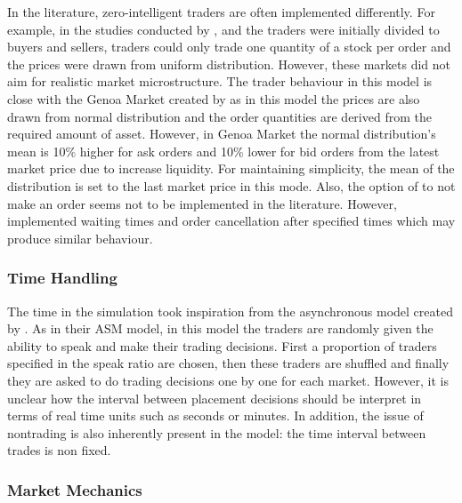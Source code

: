 In the literature, zero-intelligent traders are often implemented differently. For example, in the studies conducted by 
\citet{God93}, \citet{Jam96} and \citet{Mil08} the traders were initially divided to buyers and
sellers, traders could only trade one quantity of a stock per order and the prices
were drawn from uniform distribution. However, these markets did not aim for
realistic market microstructure. The trader behaviour in this model is close with the Genoa Market
created by \citet{Genoa01} as in this model the prices are also drawn from normal distribution and
the order quantities are derived from the required amount of asset. However, in Genoa Market the
normal distribution's mean is 10\% higher for ask orders and 10\% lower for bid orders from the
latest market price due to increase liquidity. For maintaining simplicity, the mean of the distribution
is set to the last market price in this mode. Also, the option of to not make an order seems not to be
implemented in the literature. However, \citet{Raberto05} implemented waiting times and order cancellation
after specified times which may produce similar behaviour. 

\subsubsection{Time Handling}

The time in the simulation took inspiration from the asynchronous model created by \citet{Julien07}. 
As in their ASM model, in this model the traders are randomly given the ability to speak and make 
their trading decisions. First a proportion of traders specified in the speak ratio are chosen,
then these traders are shuffled and finally they are asked to do trading decisions one by one
for each market. However, it is unclear how the interval between placement decisions should be
interpret in terms of real time units such as seconds or minutes. In addition, the issue of 
nontrading is also inherently present in the model: the time interval between trades is non fixed.

\subsubsection{Market Mechanics}


